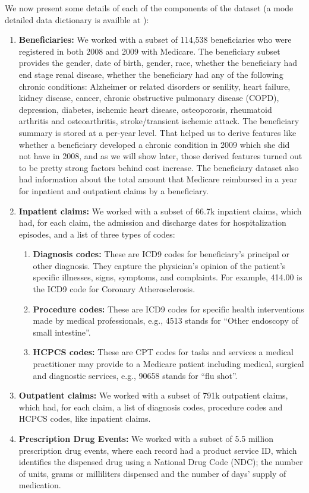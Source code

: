 We now present some details of each of the components of the dataset (a mode detailed data dictionary is availble at \cite{datadic}): 
\begin{enumerate}
\item {\bf Beneficiaries:} We worked with a subset of 114,538 beneficiaries who were registered in both 2008 and 2009 with Medicare. The beneficiary subset provides the gender, date of birth, gender, race, whether the beneficiary had end stage renal disease, whether the beneficiary had any of the following chronic conditions: Alzheimer or related disorders or senility, heart failure, kidney disease, cancer, chronic obstructive pulmonary disease (COPD), depression, diabetes, ischemic heart disease, osteoporosis, rheumatoid arthritis and osteoarthritis, stroke/transient ischemic attack. The beneficiary summary is stored at a per-year level. That helped us to derive features like whether a beneficiary developed a chronic condition in 2009 which she did not have in 2008, and as we will show later, those derived features turned out to be pretty strong factors behind cost increase. The beneficiary dataset also had information about the total amount that Medicare reimbursed in a year for inpatient and outpatient claims by a beneficiary.  
\item {\bf Inpatient claims:} We worked with a subset of 66.7k inpatient claims, which had, for each claim, the admission and discharge dates for hospitalization episodes, and a list of three types of codes:
\begin{enumerate}
\item {\bf Diagnosis codes: }These are ICD9 \cite{icd9} codes for beneficiary's principal or other diagnosis. They capture the physician's opinion of the patient's specific illnesses, signs, symptoms, and complaints. For example, 414.00 is the ICD9 code for Coronary Atherosclerosis.
\item {\bf Procedure codes: }These are ICD9 codes for specific health interventions made by medical professionals, e.g., 4513 stands for ``Other endoscopy of small intestine''.
\item {\bf HCPCS codes: }These are CPT codes for tasks and services a medical practitioner may provide to a Medicare patient including medical, surgical and diagnostic services, e.g., 90658 stands for ``flu shot''.
\end{enumerate}
\item {\bf Outpatient claims:} We worked with a subset of 791k outpatient claims, which had, for each claim, a list of diagnosis codes, procedure codes and HCPCS codes, like inpatient claims.
\item {\bf Prescription Drug Events: }We worked with a subset of 5.5 million prescription drug events, where each record had a product service ID, which identifies the dispensed drug using a National Drug Code (NDC); the number of units, grams or milliliters dispensed and the number of days' supply of medication.
\end{enumerate}

